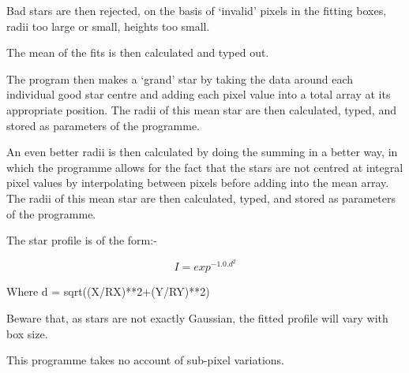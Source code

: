 {{   Bad stars are then rejected, on the basis of `invalid' pixels
   in the fitting boxes, radii too large or small, heights too small.
                                                                               
   The mean of the fits is then calculated and typed out.
                                                                               
   The program then makes a `grand' star by taking the data around
   each individual good star centre and adding each pixel value into
   a total array at its appropriate position. The radii of this mean
   star are then calculated, typed, and stored as parameters of the
   programme.
                                                                               
   An even better radii is then calculated by doing the summing in a
   better way, in which the programme allows for the fact that the
   stars are not centred at integral pixel values by interpolating
   between pixels before adding into the mean array. The radii of
   this mean star are then calculated, typed, and stored as parameters
   of the programme.
                                                                               
   The star profile is of the form:-
                                                                               
                                                                               
                                                                               
  $$ I = exp^{-1.0.d^2} $$
                                                                               
  Where d = sqrt((X/RX)**2+(Y/RY)**2)
                                                                               
                                                                               
    Beware that, as stars are not exactly Gaussian, the fitted profile
    will vary with box size.
                                                                               
  This programme takes no account of sub-pixel variations.

}}
